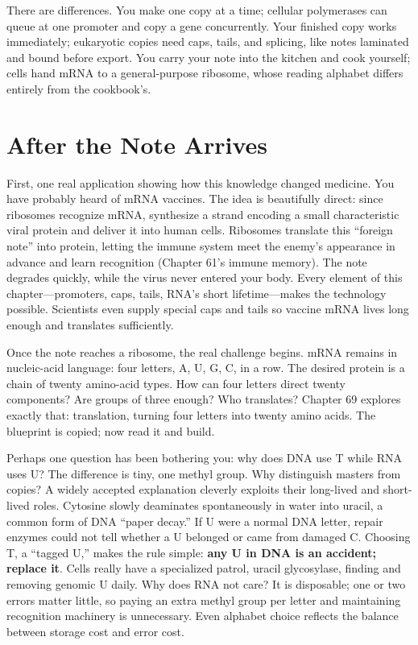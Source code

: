 There are differences. You make one copy at a time; cellular polymerases can queue at one promoter and copy a gene concurrently. Your finished copy works immediately; eukaryotic copies need caps, tails, and splicing, like notes laminated and bound before export. You carry your note into the kitchen and cook yourself; cells hand mRNA to a general-purpose ribosome, whose reading alphabet differs entirely from the cookbook's.

\section{After the Note Arrives}

First, one real application showing how this knowledge changed medicine. You have probably heard of mRNA vaccines. The idea is beautifully direct: since ribosomes recognize mRNA, synthesize a strand encoding a small characteristic viral protein and deliver it into human cells. Ribosomes translate this ``foreign note'' into protein, letting the immune system meet the enemy's appearance in advance and learn recognition (Chapter 61's immune memory). The note degrades quickly, while the virus never entered your body. Every element of this chapter---promoters, caps, tails, RNA's short lifetime---makes the technology possible. Scientists even supply special caps and tails so vaccine mRNA lives long enough and translates sufficiently.

Once the note reaches a ribosome, the real challenge begins. mRNA remains in nucleic-acid language: four letters, A, U, G, C, in a row. The desired protein is a chain of twenty amino-acid types. How can four letters direct twenty components? Are groups of three enough? Who translates? Chapter 69 explores exactly that: translation, turning four letters into twenty amino acids. The blueprint is copied; now read it and build.

\begin{tiaozhan}
Perhaps one question has been bothering you: why does DNA use T while RNA uses U? The difference is tiny, one methyl group. Why distinguish masters from copies? A widely accepted explanation cleverly exploits their long-lived and short-lived roles. Cytosine slowly deaminates spontaneously in water into uracil, a common form of DNA ``paper decay.'' If U were a normal DNA letter, repair enzymes could not tell whether a U belonged or came from damaged C. Choosing T, a ``tagged U,'' makes the rule simple: \textbf{any U in DNA is an accident; replace it}. Cells really have a specialized patrol, uracil glycosylase, finding and removing genomic U daily. Why does RNA not care? It is disposable; one or two errors matter little, so paying an extra methyl group per letter and maintaining recognition machinery is unnecessary. Even alphabet choice reflects the balance between storage cost and error cost.
\end{tiaozhan}

